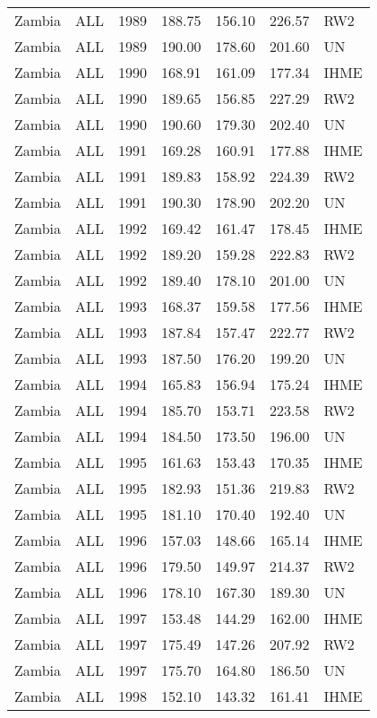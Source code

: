 \begin{longtable}{lllrrrl}
  Zambia & ALL & 1989 & 188.75 & 156.10 & 226.57 & RW2 \\ 
  Zambia & ALL & 1989 & 190.00 & 178.60 & 201.60 & UN \\ 
  Zambia & ALL & 1990 & 168.91 & 161.09 & 177.34 & IHME \\ 
  Zambia & ALL & 1990 & 189.65 & 156.85 & 227.29 & RW2 \\ 
  Zambia & ALL & 1990 & 190.60 & 179.30 & 202.40 & UN \\ 
  Zambia & ALL & 1991 & 169.28 & 160.91 & 177.88 & IHME \\ 
  Zambia & ALL & 1991 & 189.83 & 158.92 & 224.39 & RW2 \\ 
  Zambia & ALL & 1991 & 190.30 & 178.90 & 202.20 & UN \\ 
  Zambia & ALL & 1992 & 169.42 & 161.47 & 178.45 & IHME \\ 
  Zambia & ALL & 1992 & 189.20 & 159.28 & 222.83 & RW2 \\ 
  Zambia & ALL & 1992 & 189.40 & 178.10 & 201.00 & UN \\ 
  Zambia & ALL & 1993 & 168.37 & 159.58 & 177.56 & IHME \\ 
  Zambia & ALL & 1993 & 187.84 & 157.47 & 222.77 & RW2 \\ 
  Zambia & ALL & 1993 & 187.50 & 176.20 & 199.20 & UN \\ 
  Zambia & ALL & 1994 & 165.83 & 156.94 & 175.24 & IHME \\ 
  Zambia & ALL & 1994 & 185.70 & 153.71 & 223.58 & RW2 \\ 
  Zambia & ALL & 1994 & 184.50 & 173.50 & 196.00 & UN \\ 
  Zambia & ALL & 1995 & 161.63 & 153.43 & 170.35 & IHME \\ 
  Zambia & ALL & 1995 & 182.93 & 151.36 & 219.83 & RW2 \\ 
  Zambia & ALL & 1995 & 181.10 & 170.40 & 192.40 & UN \\ 
  Zambia & ALL & 1996 & 157.03 & 148.66 & 165.14 & IHME \\ 
  Zambia & ALL & 1996 & 179.50 & 149.97 & 214.37 & RW2 \\ 
  Zambia & ALL & 1996 & 178.10 & 167.30 & 189.30 & UN \\ 
  Zambia & ALL & 1997 & 153.48 & 144.29 & 162.00 & IHME \\ 
  Zambia & ALL & 1997 & 175.49 & 147.26 & 207.92 & RW2 \\ 
  Zambia & ALL & 1997 & 175.70 & 164.80 & 186.50 & UN \\ 
  Zambia & ALL & 1998 & 152.10 & 143.32 & 161.41 & IHME \\ 

\end{longtable}
